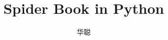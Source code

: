 \documentclass[11pt,UTF8,oneside]{mybook}
\begin{document}
\setlength{\parindent}{2em} \title{Spider Book in Python} \author{华聪}
\date{} \setlength{\parskip}{5pt} \setlength{\baselineskip}{1.5em}

\maketitle
\frontmatter

\tableofcontents
\mainmatter





\end{document}
